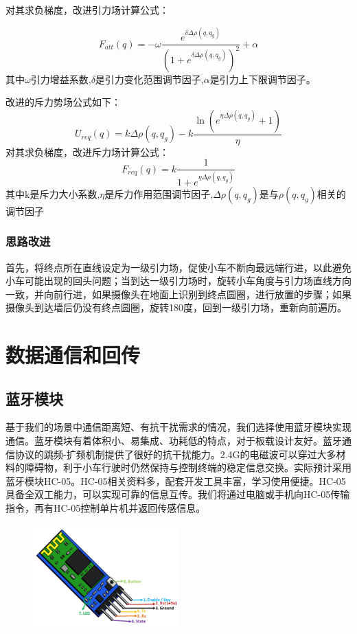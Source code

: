 \documentclass{report}
\begin{document}
对其求负梯度，改进引力场计算公式：

\[ F_{att}(q)=-\omega\frac{e^{\delta\Delta\rho(q,q_g)}}{\left(1+e^{\delta\Delta\rho(q,q_g)}\right)^2}+\alpha  \]
其中$\omega$引力增益系数,$\delta$是引力变化范围调节因子,$\alpha$是引力上下限调节因子。

改进的斥力势场公式如下：
\[ U_{req}(q)=k\Delta\rho(q,q_g)-k\frac{\ln{(e^{\eta\Delta\rho(q,q_g)}+1)}}{\eta} \]
对其求负梯度，改进斥力场计算公式：
\[ F_{req}(q)=k\frac1{1+e^{\eta\Delta\rho(q,q_g)}} \]
其中k是斥力大小系数,$\eta$是斥力作用范围调节因子,$\Delta\rho(q,q_{g})$是与$\rho(q,q_{g})$相关的调节因子
\subsubsection{思路改进}
\label{subsec:label}
首先，将终点所在直线设定为一级引力场，促使小车不断向最远端行进，以此避免小车可能出现的回头问题；当到达一级引力场时，旋转小车角度与引力场直线方向一致，并向前行进，如果摄像头在地面上识别到终点圆圈，进行放置的步骤；如果摄像头到达墙后仍没有终点圆圈，旋转180度，回到一级引力场，重新向前遍历。

\section{数据通信和回传}
\label{sec:label}
\subsection{蓝牙模块}
\label{subsec:label}
基于我们的场景中通信距离短、有抗干扰需求的情况，我们选择使用蓝牙模块实现通信。蓝牙模块有着体积小、易集成、功耗低的特点，对于板载设计友好。蓝牙通信协议的跳频-扩频机制提供了很好的抗干扰能力。2.4G的电磁波可以穿过大多材料的障碍物，利于小车行驶时仍然保持与控制终端的稳定信息交换。实际预计采用蓝牙模块HC-05。HC-05相关资料多，配套开发工具丰富，学习使用便捷。HC-05具备全双工能力，可以实现可靠的信息互传。我们将通过电脑或手机向HC-05传输指令，再有HC-05控制单片机并返回传感信息。
\begin{figure}[ht]
  \centering
  \includegraphics[width=0.5\textwidth]{figures/hc-05.png}
  \caption{\label{fig:label} }
\end{figure}
\end{document}
